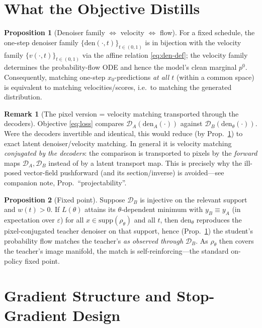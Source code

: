 \documentclass[11pt,a4paper]{article}
\newcommand{\Dec}{\mathcal{D}}
\newcommand{\den}{\mathrm{den}}
\theoremstyle{definition}
\newtheorem{proposition}{Proposition}
\newtheorem{remark}{Remark}
\begin{document}
\section{What the Objective Distills}
\label{sec:what}

\begin{proposition}[Denoiser family $\Leftrightarrow$ velocity $\Leftrightarrow$ flow]
\label{prop:equiv}
For a fixed schedule, the one-step denoiser family $\{\den(\cdot,t)\}_{t\in(0,1)}$ is in bijection
with the velocity family $\{v(\cdot,t)\}_{t\in(0,1)}$ via the affine relation \eqref{eq:den-def};
the velocity family determines the probability-flow ODE and hence the model's clean marginal
$p^{0}$. Consequently, matching one-step $x_0$-predictions \emph{at all $t$} (within a common
space) is equivalent to matching velocities/scores, i.e.\ to matching the generated distribution.
\end{proposition}

\begin{remark}[The pixel version = velocity matching transported through the decoders]
\label{rem:transport-through-decoder}
Objective \eqref{eq:loss} compares $\Dec_A(\den_A(\cdot))$ against $\Dec_B(\den_\theta(\cdot))$.
Were the decoders invertible and identical, this would reduce (by Prop.~\ref{prop:equiv}) to exact
latent denoiser/velocity matching. In general it is velocity matching \emph{conjugated by the
decoders}: the comparison is transported to pixels by the \emph{forward} maps $\Dec_A,\Dec_B$
instead of by a latent transport map. This is precisely why the ill-posed vector-field pushforward
(and its section/inverse) is avoided---see companion note, Prop.~``projectability''.
\end{remark}

\begin{proposition}[Fixed point]
\label{prop:fixed-point}
Suppose $\Dec_B$ is injective on the relevant support and $w(t)>0$. If $L(\theta)$ attains its
$\theta$-dependent minimum with $y_B\equiv y_A$ (in expectation over $\varepsilon$) for all
$x\in\mathrm{supp}(\rho_\theta)$ and all $t$, then $\den_\theta$ reproduces the pixel-conjugated
teacher denoiser on that support, hence (Prop.~\ref{prop:equiv}) the student's probability flow
matches the teacher's \emph{as observed through} $\Dec_B$. As $\rho_\theta$ then covers the
teacher's image manifold, the match is self-reinforcing---the standard on-policy fixed point.
\end{proposition}

\section{Gradient Structure and Stop-Gradient Design}
\label{sec:grad}
\end{document}
